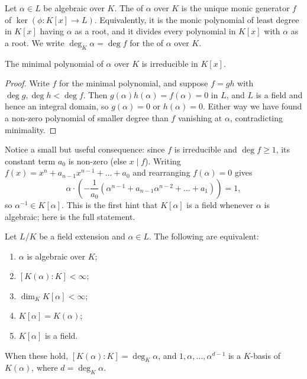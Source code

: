 \documentclass[a4paper]{scrartcl}
\begin{document}
\begin{definition}
	Let $\alpha \in L$ be algebraic over $K$. The  of $\alpha$ over $K$ is the unique monic generator $f$ of $\ker(\phi : K[x] \to L)$. Equivalently, it is the monic polynomial of least degree in $K[x]$ having $\alpha$ as a root, and it divides every polynomial in $K[x]$ with $\alpha$ as a root. We write $\deg_K \alpha = \deg f$ for the  of $\alpha$ over $K$.
\end{definition}

\begin{lemma}
	The minimal polynomial of $\alpha$ over $K$ is irreducible in $K[x]$.
\end{lemma}

\begin{proof}
	Write $f$ for the minimal polynomial, and suppose $f = gh$ with $\deg g, \deg h < \deg f$. Then $g(\alpha)h(\alpha) = f(\alpha) = 0$ in $L$, and $L$ is a field and hence an integral domain, so $g(\alpha) = 0$ or $h(\alpha) = 0$. Either way we have found a non-zero polynomial of smaller degree than $f$ vanishing at $\alpha$, contradicting minimality.
\end{proof}

Notice a small but useful consequence: since $f$ is irreducible and $\deg f \geq 1$, its constant term $a_0$ is non-zero (else $x \mid f$). Writing $f(x) = x^n + a_{n-1}x^{n-1} + \dots + a_0$ and rearranging $f(\alpha) = 0$ gives
$$\alpha \cdot \left( -\frac{1}{a_0}\left(\alpha^{n-1} + a_{n-1}\alpha^{n-2} + \dots + a_1 \right)\right) = 1,$$
so $\alpha^{-1} \in K[\alpha]$. This is the first hint that $K[\alpha]$ is a field whenever $\alpha$ is algebraic; here is the full statement.

\begin{proposition}\label{prop:algebraictfae}
	Let $L/K$ be a field extension and $\alpha \in L$. The following are equivalent:
	\begin{enumerate}[label=(\roman*)]
		\item $\alpha$ is algebraic over $K$;
		\item $[K(\alpha) : K] < \infty$;
		\item $\dim_K K[\alpha] < \infty$;
		\item $K[\alpha] = K(\alpha)$;
		\item $K[\alpha]$ is a field.
	\end{enumerate}
	When these hold, $[K(\alpha) : K] = \deg_K \alpha$, and $1, \alpha, \dots, \alpha^{d-1}$ is a $K$-basis of $K(\alpha)$, where $d = \deg_K \alpha$.
\end{proposition}
\end{document}
